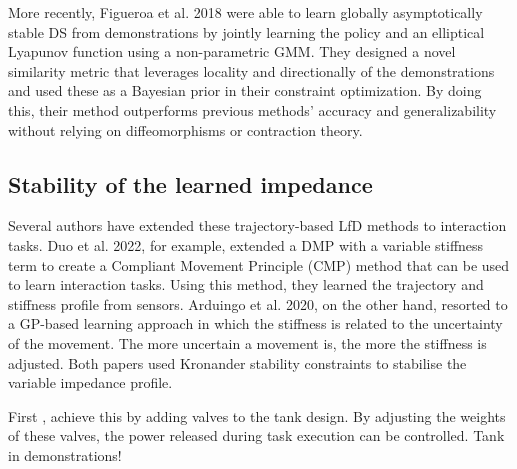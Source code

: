 More recently, Figueroa et al. 2018 \cite{figueroafernandezPhysicallyconsistentBayesianNonparametric2018} were able to learn globally asymptotically stable DS from demonstrations by jointly learning the policy and an elliptical Lyapunov function using a non-parametric GMM. They designed a novel similarity metric that leverages locality and directionally of the demonstrations and used these as a Bayesian prior in their constraint optimization. By doing this, their method outperforms previous methods' accuracy and generalizability without relying on diffeomorphisms or contraction theory.





\subsection{Stability of the learned impedance}

Several authors have extended these trajectory-based LfD methods to interaction tasks. Duo et al. 2022, for example, \cite{douRobotSkillLearning2022} extended a DMP with a variable stiffness term to create a Compliant Movement Principle (CMP) method that can be used to learn interaction tasks. Using this method, they learned the trajectory and stiffness profile from sensors. Arduingo et al. 2020, on the other hand, resorted to a GP-based learning approach in which the stiffness is related to the uncertainty of the movement. The more uncertain a movement is, the more the stiffness is adjusted. Both papers used Kronander stability constraints to stabilise the variable impedance profile.

First \cite{shahriariAdaptingContactsEnergy2017}, achieve this by adding valves to the tank design. By adjusting the weights of these valves, the power released during task execution can be controlled. Tank in demonstrations!


